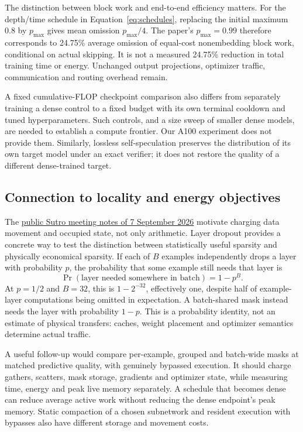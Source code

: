 \documentclass[10pt,letterpaper]{article}
\begin{document}
The distinction between block work and end-to-end efficiency matters. For the depth/time schedule in Equation~\ref{eq:schedules}, replacing the initial maximum 0.8 by $p_{\max}$ gives mean omission $p_{\max}/4$. The paper's $p_{\max}=0.99$ therefore corresponds to 24.75\% average omission of equal-cost nonembedding block work, conditional on actual skipping. It is not a measured 24.75\% reduction in total training time or energy. Unchanged output projections, optimizer traffic, communication and routing overhead remain.

A fixed cumulative-FLOP checkpoint comparison also differs from separately training a dense control to a fixed budget with its own terminal cooldown and tuned hyperparameters. Such controls, and a size sweep of smaller dense models, are needed to establish a compute frontier. Our A100 experiment does not provide them. Similarly, lossless self-speculation preserves the distribution of its own target model under an exact verifier; it does not restore the quality of a different dense-trained target.

\subsection{Connection to locality and energy objectives}
The \href{https://yaroslavvb.github.io/gyroscope/meetings/2026-09-07-061a993a3e32a40a.html}{public Sutro meeting notes of 7 September 2026} motivate charging data movement and occupied state, not only arithmetic. Layer dropout provides a concrete way to test the distinction between statistically useful sparsity and physically economical sparsity. If each of $B$ examples independently drops a layer with probability $p$, the probability that some example still needs that layer is
\begin{equation}
\Pr(\text{layer needed somewhere in batch})=1-p^B.
\end{equation}
At $p=1/2$ and $B=32$, this is $1-2^{-32}$, effectively one, despite half of example-layer computations being omitted in expectation. A batch-shared mask instead needs the layer with probability $1-p$. This is a probability identity, not an estimate of physical transfers: caches, weight placement and optimizer semantics determine actual traffic.

A useful follow-up would compare per-example, grouped and batch-wide masks at matched predictive quality, with genuinely bypassed execution. It should charge gathers, scatters, mask storage, gradients and optimizer state, while measuring time, energy and peak live memory separately. A schedule that becomes dense can reduce average active work without reducing the dense endpoint's peak memory. Static compaction of a chosen subnetwork and resident execution with bypasses also have different storage and movement costs.
\end{document}
